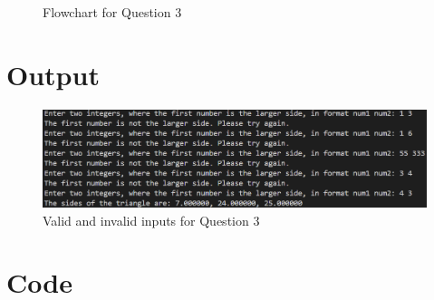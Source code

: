 \documentclass{article}
\begin{document}
\begin{flushleft}
\begin{figure}[!h]
\begin{centering}
			\caption{Flowchart for Question 3}
		\end{centering}
	\end{figure}
	\section{Output}
	\begin{figure}[!h]
		\begin{centering}
			\includegraphics[width=\linewidth]{Q3Output.png}
			\caption{Valid and invalid inputs for Question 3}
		\end{centering}
	\end{figure}
	\newpage
	\section{Code}
	
\end{flushleft}
\end{document}
